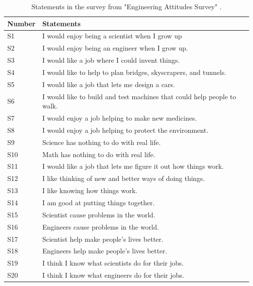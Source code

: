 \documentclass[sigconf]{acmart}
\begin{document}
\begin{table}[h]
  \caption{Statements in the survey from "Engineering Attitudes Survey" \cite{cunningham2010impact}.
}
  \label{tab:questions}
  \begin{tabular}{ll}
    \toprule
    Number & Statements \\
    \midrule
    S1 & I would enjoy being a scientist when I grow up \\
    S2 & I would enjoy being an engineer when I grow up.  \\
    S3 & I would like a job where I could invent things. \\
    S4 & I would like to help to plan bridges, skyscrapers, and tunnels. \\
    S5 & I would like a job that lets me design a cars. \\   
    S6 & I would like to build and test machines that could help people to walk. \\
    S7 & I would enjoy a job helping to make new medicines. \\
    S8 & I would enjoy a job helping to protect the environment. \\
    S9 & Science has nothing to do with real life. \\
    S10 & Math has nothing to do with real life. \\
    S11 & I would like a job that lets me figure it out how things work. \\
    S12 & I like thinking of new and better ways of doing things. \\
    S13 & I like knowing how things work. \\
    S14 & I am good at putting things together. \\
    S15 & Scientist cause problems in the world. \\
    S16 & Engineers cause problems in the world. \\
    S17 & Scientist help make people’s lives better. \\
    S18 & Engineers help make people’s lives better. \\
    S19 & I think I know what scientists do for their jobs. \\
    S20 & I think I know what engineers do for their jobs. \\
    \bottomrule
  \end{tabular}
\end{table}
\end{document}
